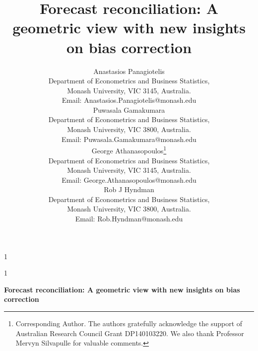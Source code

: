 \documentclass[12pt]{article}
\newcommand{\blind}{1}
\theoremstyle{definition}
\begin{document}

\blind
{
  \title{\bf Forecast reconciliation: A geometric view with new insights on bias correction}
  \author{Anastasios Panagiotelis\\
    Department of Econometrics and Business Statistics,\\
    Monash University, VIC 3145, Australia.\\
    Email: Anastasios.Panagiotelis@monash.edu \\[0.6cm]
    Puwasala Gamakumara\\
    Department of Econometrics and Business Statistics,\\
    Monash University, VIC 3800, Australia.\\
    Email: Puwasala.Gamakumara@monash.edu \\[0.6cm]
    George Athanasopoulos\thanks{Corresponding Author. The authors gratefully acknowledge the support of Australian Research Council Grant DP140103220. We also thank Professor Mervyn Silvapulle for valuable comments.}\hspace{.2cm}\\
    Department of Econometrics and Business Statistics,\\
    Monash University, VIC 3145, Australia.\\
    Email: George.Athanasopoulos@monash.edu \\[0.6cm]
    Rob J Hyndman\\
    Department of Econometrics and Business Statistics,\\
    Monash University, VIC 3800, Australia.\\
    Email: Rob.Hyndman@monash.edu\\[1.5cm]}
  \maketitle
} \fi

\blind
{
  \bigskip
  \bigskip
  \bigskip
  \begin{center}
    {\LARGE\bf Forecast reconciliation: A geometric view with new insights on bias correction}
  \end{center}
  \medskip
} \fi

\newpage
\end{document}
